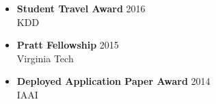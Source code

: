 
\begin{itemize}
  \setlength\itemsep{.1em}
\item \textbf{Student Travel Award} \hfill 2016\\
       KDD

\item \textbf{Pratt Fellowship} \hfill 2015\\
Virginia Tech
\item \textbf{Deployed Application Paper Award} \hfill 2014\\
IAAI
\end{itemize}

